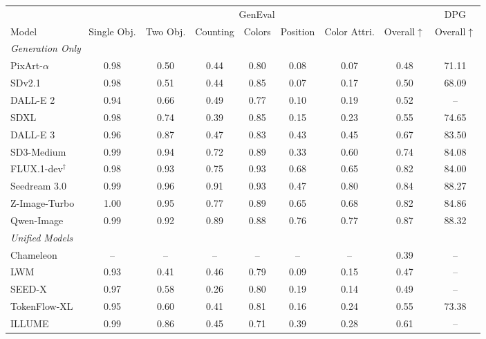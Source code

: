 \documentclass{llmxive}
\begin{document}
\begin{table}[t]
\centering
\small
\setlength{\tabcolsep}{2.8pt}
\begin{tabular}{l|ccccccc|c}
\toprule
& \multicolumn{7}{c|}{GenEval} & DPG \\
\cmidrule(lr){2-8} \cmidrule(lr){9-9}
Model & Single Obj. & Two Obj. & Counting & Colors & Position & Color Attri. & Overall$\uparrow$ & Overall$\uparrow$ \\
\midrule
\multicolumn{9}{l}{\textit{Generation Only}} \\
\midrule
PixArt-$\alpha$~\cite{pixart}     & 0.98 & 0.50 & 0.44 & 0.80 & 0.08 & 0.07 & 0.48 & 71.11 \\
SDv2.1~\cite{stable_diff}               & 0.98 & 0.51 & 0.44 & 0.85 & 0.07 & 0.17 & 0.50 & 68.09 \\
DALL-E 2~\cite{dalle2}            & 0.94 & 0.66 & 0.49 & 0.77 & 0.10 & 0.19 & 0.52 & -- \\
SDXL~\cite{sdxl}                  & 0.98 & 0.74 & 0.39 & 0.85 & 0.15 & 0.23 & 0.55 & 74.65 \\
DALL-E 3~\cite{dalle3}            & 0.96 & 0.87 & 0.47 & 0.83 & 0.43 & 0.45 & 0.67 & 83.50 \\
SD3-Medium~\cite{sd3}             & 0.99 & 0.94 & 0.72 & 0.89 & 0.33 & 0.60 & 0.74 & 84.08 \\
FLUX.1-dev$^\dagger$~\cite{flux}  & 0.98 & 0.93 & 0.75 & 0.93 & 0.68 & 0.65 & 0.82 & 84.00 \\
Seedream 3.0~\cite{seedream}      & 0.99 & 0.96 & 0.91 & 0.93 & 0.47 & 0.80 & 0.84 & 88.27 \\
Z-Image-Turbo~\cite{zimageturbo}  & 1.00 & 0.95 & 0.77 & 0.89 & 0.65 & 0.68 & 0.82 & 84.86 \\
Qwen-Image~\cite{qwenimage}       & 0.99 & 0.92 & 0.89 & 0.88 & 0.76 & 0.77 & 0.87 & 88.32 \\
\midrule
\multicolumn{9}{l}{\textit{Unified Models}} \\
\midrule
Chameleon~\cite{chameleon}         & --   & --   & --   & --   & --   & --   & 0.39 & -- \\
LWM~\cite{lwm}                    & 0.93 & 0.41 & 0.46 & 0.79 & 0.09 & 0.15 & 0.47 & -- \\
SEED-X~\cite{seedx}               & 0.97 & 0.58 & 0.26 & 0.80 & 0.19 & 0.14 & 0.49 & -- \\
TokenFlow-XL~\cite{tokenflow}     & 0.95 & 0.60 & 0.41 & 0.81 & 0.16 & 0.24 & 0.55 & 73.38 \\
ILLUME~\cite{illume}               & 0.99 & 0.86 & 0.45 & 0.71 & 0.39 & 0.28 & 0.61 & -- \\

\end{tabular}
\end{table}
\end{document}
